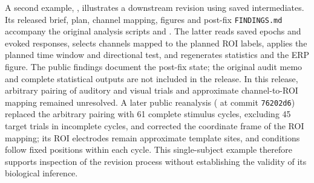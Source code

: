A second example, , illustrates a downstream revision using saved intermediates. Its released brief, plan, channel mapping, figures and post-fix \texttt{FINDINGS.md} accompany the original analysis scripts and . The latter reads saved epochs and evoked responses, selects channels mapped to the planned ROI labels, applies the planned time window and directional test, and regenerates statistics and the ERP figure. The public findings document the post-fix state; the original audit memo and complete statistical outputs are not included in the release. In this release, arbitrary pairing of auditory and visual trials and approximate channel-to-ROI mapping remained unresolved. A later public reanalysis ( at commit \texttt{76202d6}) replaced the arbitrary pairing with 61 complete stimulus cycles, excluding 45 target trials in incomplete cycles, and corrected the coordinate frame of the ROI mapping; its ROI electrodes remain approximate template sites, and conditions follow fixed positions within each cycle. This single-subject example therefore supports inspection of the revision process without establishing the validity of its biological inference.


\FloatBarrier
{}
